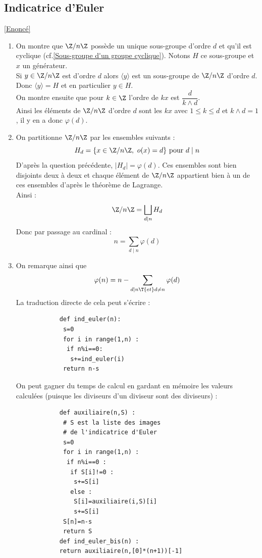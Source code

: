 \documentclass[8pt]{book}
\begin{document}
	\subsection{Indicatrice d'Euler}
	\label{Indicatrice d'Euler corrigé}
	\textcolor{blue}{\hyperref[Indicatrice d'Euler]{[Enoncé]}}\\
	\begin{enumerate}[leftmargin=*]
		\item On montre que $\Z/n\Z$ possède un unique sous-groupe d'ordre $d$ et qu'il est cyclique (cf.\ref{Sous-groupe d'un groupe cyclique}). Notons $H$ ce sous-groupe et $x$ un générateur.\\
		Si $y\in \Z/n\Z$ est d'ordre $d$ alors $\langle y\rangle$ est un sous-groupe de $\Z/n\Z$ d'ordre $d$. Donc $\langle y\rangle=H$ et en particulier $y\in H$.\\
		On montre ensuite que pour $k\in \Z$ l'ordre de $kx$ est $\dfrac{d}{k\wedge d}$.\\
		Ainsi les éléments de $\Z/n\Z$ d'ordre $d$ sont les $kx$ avec $1\leq k\leq d$ et $k\wedge d=1$, il y en a donc $\varphi(d)$.
		\item On partitionne $\Z/n\Z$ par les ensembles suivants :
		\[
		H_d=\{x\in\Z/n\Z,\ o(x)=d\} \text{ pour }d\mid n
		\]
		D'après la question précédente, $|H_d|=\varphi(d)$.
		Ces ensembles sont bien disjoints deux à deux et chaque élément de $\Z/n\Z$ appartient bien à un de ces ensembles d'après le théorème de Lagrange.\\
		Ainsi : \[\Z/n\Z=\bigsqcup_{d\mid n}H_d\]
		Donc par passage au cardinal : \[n=\sum_{d\mid n}\varphi(d)\]
		\item On remarque ainsi que \[\varphi(n)=n-\sum_{d\mid n\T{ et } d\ne n} \varphi(d)\]
		La traduction directe de cela peut s'écrire :
		\begin{lstlisting}
			def ind_euler(n):
			 s=0
			 for i in range(1,n) : 
			  if n%i==0:
			   s+=ind_euler(i)
			 return n-s
		\end{lstlisting}
		On peut gagner du temps de calcul en gardant en mémoire les valeurs calculées (puisque les diviseurs d'un diviseur sont des diviseurs) :
		\begin{lstlisting}
			def auxiliaire(n,S) :
			 # S est la liste des images
			 # de l'indicatrice d'Euler
			 s=0
			 for i in range(1,n) :
			  if n%i==0 :
			   if S[i]!=0 :
			    s+=S[i]
			   else :
			    S[i]=auxiliaire(i,S)[i]
			    s+=S[i]
			 S[n]=n-s
			 return S
			def ind_euler_bis(n) :
			return auxiliaire(n,[0]*(n+1))[-1]
		\end{lstlisting}

\end{enumerate}
\end{document}
